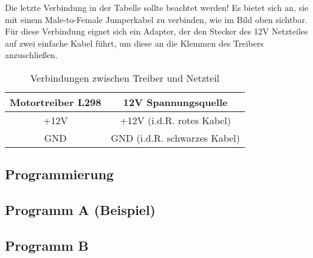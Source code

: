 Die letzte Verbindung in der Tabelle sollte beachtet werden! Es bietet sich an, sie mit einem Male-to-Female Jumperkabel zu verbinden, wie im Bild oben sichtbar.\\

Für diese Verbindung eignet sich ein Adapter, der den Stecker des 12V Netzteiles auf zwei einfache Kabel führt, um diese an die Klemmen des Treibers anzuschließen.

\begin{table}[h]
  \begin{center}
\begin{tabular}{@{}cc@{}}
\toprule
Motortreiber L298 & 12V Spannungsquelle          \\ \midrule
+12V              & +12V (i.d.R. rotes Kabel)    \\
GND               & GND (i.d.R. schwarzes Kabel) \\ \bottomrule
\end{tabular}
\end{center}
\caption{Verbindungen zwischen Treiber und Netzteil}
\end{table}


\subsection{Programmierung}
\subsection{Programm A (Beispiel)}
\subsection{Programm B}
